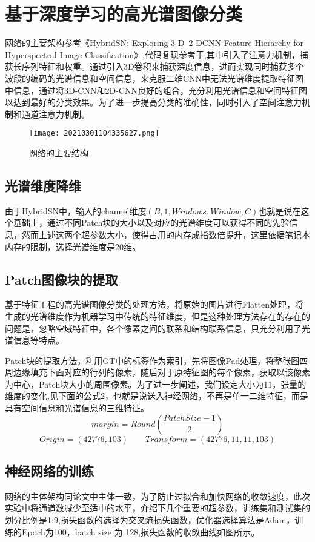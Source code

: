 \documentclass[runningheads]{llncs}
\begin{document}
\section{基于深度学习的高光谱图像分类}
网络的主要架构参考《HybridSN: Exploring 3-D–2-DCNN Feature Hierarchy for Hyperspectral Image Classification》\cite{2020HybridSN},代码复现参考于\cite{Tesera__},其中引入了注意力机制，捕获长序列特征和权重。通过引入3D卷积来捕获深度信息，进而实现同时捕获多个波段的编码的光谱信息和空间信息，来克服二维CNN中无法光谱维度提取特征图中信息，通过将3D-CNN和2D-CNN良好的组合，充分利用光谱信息和空间特征图以达到最好的分类效果。为了进一步提高分类的准确性，同时引入了空间注意力机制和通道注意力机制。
\begin{figure}[htbp]
    \centering
    \texttt{[image: 20210301104335627.png]}
    \caption{网络的主要结构}
    \label{fig:encoder}
\end{figure}

\subsection{光谱维度降维}
由于HybridSN中，输入的channel维度$(B,1,Windows,Window,C)$也就是说在这个基础上，通过不同Patch块的大小以及对应的光谱维度可以获得不同的先验信息，然而上述这两个超参数大小，使得占用的内存成指数倍提升，这里依据笔记本内存的限制，选择光谱维度是20维。
\subsection{Patch图像块的提取}
基于特征工程的高光谱图像分类的处理方法，将原始的图片进行Flatten处理，将生成的光谱维度作为机器学习中传统的特征维度，但是这种处理方法存在的存在的问题是，忽略空域特征中，各个像素之间的联系和结构联系信息，只充分利用了光谱信息等特点。


Patch块的提取方法，利用GT中的标签作为索引，先将图像Pad处理，将整张图四周边缘填充下面对应的行列的像素，随后对于原特征图的每个像素，获取以该像素为中心，Patch块大小的周围像素。为了进一步阐述，我们设定大小为11，张量的维度的变化,见下面的公式2，也就是说送入神经网络，不再是单一二维特征，而是具有空间信息和光谱信息的三维特征。
\begin{equation}
    margin = Round(\frac{Patch Size-1}{2})
\end{equation}
\begin{equation}
    Origin = (42776,103)\qquad
    Transform =(42776,11,11,103)
\end{equation}

\subsection{神经网络的训练}
网络的主体架构同论文中主体一致，为了防止过拟合和加快网络的收敛速度，此次实验中将通道数减少至适中的水平，介绍下几个重要的超参数，训练集和测试集的划分比例是1:9,损失函数的选择为交叉熵损失函数，优化器选择算法是Adam，训练的Epoch为100，batch size 为 128,损失函数的收敛曲线如图所示。
\end{document}
